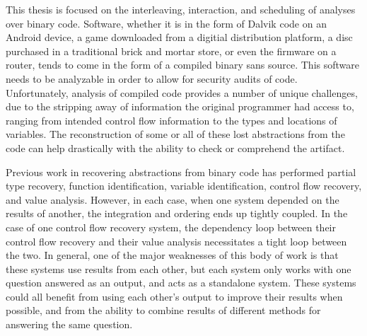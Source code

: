 \newcommand{\sysname}{Holmes}
This thesis is focused on the interleaving, interaction, and scheduling of analyses over binary code.
Software, whether it is in the form of Dalvik code on an Android device, a game downloaded from a digitial distribution platform, a disc purchased in a traditional brick and mortar store, or even the firmware on a router, tends to come in the form of a compiled binary sans source.
This software needs to be analyzable in order to allow for security audits of code.
Unfortunately, analysis of compiled code provides a number of unique challenges, due to the stripping away of information the original programmer had access to, ranging from intended control flow information to the types and locations of variables.
The reconstruction of some or all of these lost abstractions from the code can help drastically with the ability to check or comprehend the artifact.

Previous work in recovering abstractions from binary code has performed partial type recovery, function identification, variable identification, control flow recovery, and value analysis.
However, in each case, when one system depended on the results of another, the integration and ordering ends up tightly coupled.
In the case of one control flow recovery system, the dependency loop between their control flow recovery and their value analysis necessitates a tight loop between the two.
In general, one of the major weaknesses of this body of work is that these systems use results from each other, but each system only works with one question answered as an output, and acts as a standalone system.
These systems could all benefit from using each other's output to improve their results when possible, and from the ability to combine results of different methods for answering the same question.

